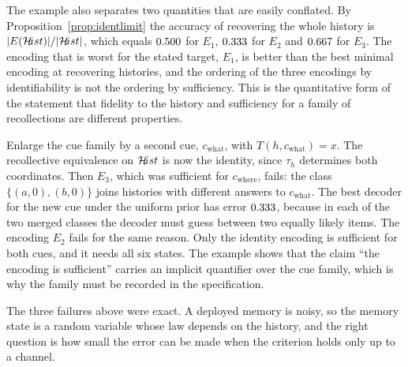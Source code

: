 The example also separates two quantities that are easily conflated. By Proposition~\ref{prop:identlimit} the accuracy of recovering the whole history is $|E(\mathcal{H}\!ist)|/|\mathcal{H}\!ist|$, which equals $0.500$ for $E_1$, $0.333$ for $E_2$ and $0.667$ for $E_3$. The encoding that is worst for the stated target, $E_1$, is better than the best minimal encoding at recovering histories, and the ordering of the three encodings by identifiability is not the ordering by sufficiency. This is the quantitative form of the statement that fidelity to the history and sufficiency for a family of recollections are different properties.

\begin{counterex}\label{cex:cuefamily}
Enlarge the cue family by a second cue, $c_{\mathrm{what}}$, with $T(h,c_{\mathrm{what}})=x$. The recollective equivalence on $\mathcal{H}\!ist$ is now the identity, since $\tau_h$ determines both coordinates. Then $E_3$, which was sufficient for $c_{\mathrm{where}}$, fails: the class $\{(a,0),(b,0)\}$ joins histories with different answers to $c_{\mathrm{what}}$. The best decoder for the new cue under the uniform prior has error $0.333$, because in each of the two merged classes the decoder must guess between two equally likely items. The encoding $E_2$ fails for the same reason. Only the identity encoding is sufficient for both cues, and it needs all six states. The example shows that the claim ``the encoding is sufficient'' carries an implicit quantifier over the cue family, which is why the family must be recorded in the specification.
\end{counterex}

The three failures above were exact. A deployed memory is noisy, so the memory state is a random variable whose law depends on the history, and the right question is how small the error can be made when the criterion holds only up to a channel.

